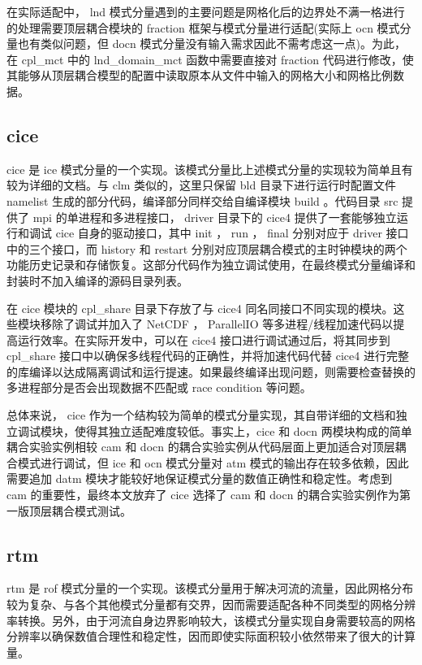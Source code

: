 在实际适配中， lnd 模式分量遇到的主要问题是网格化后的边界处不满一格进行的处理需要顶层耦合模块的 fraction 框架与模式分量进行适配(实际上 ocn 模式分量也有类似问题，但 docn 模式分量没有输入需求因此不需考虑这一点)。为此，在 cpl\_mct 中的 lnd\_domain\_mct 函数中需要直接对 fraction 代码进行修改，使其能够从顶层耦合模型的配置中读取原本从文件中输入的网格大小和网格比例数据。

\subsection{cice}

cice \cite{CICEdoc} \cite{CICEgithub} 是 ice 模式分量的一个实现。该模式分量比上述模式分量的实现较为简单且有较为详细的文档。与 clm 类似的，这里只保留 bld 目录下进行运行时配置文件 namelist 生成的部分代码，编译部分同样交给自编译模块 build 。代码目录 src 提供了 mpi 的单进程和多进程接口， driver 目录下的 cice4 提供了一套能够独立运行和调试 cice 自身的驱动接口，其中 init ， run ， final 分别对应于 driver 接口中的三个接口，而 history 和 restart 分别对应顶层耦合模式的主时钟模块的两个功能历史记录和存储恢复。这部分代码作为独立调试使用，在最终模式分量编译和封装时不加入编译的源码目录列表。

在 cice 模块的 cpl\_share 目录下存放了与 cice4 同名同接口不同实现的模块。这些模块移除了调试并加入了 NetCDF ， ParallelIO 等多进程/线程加速代码以提高运行效率。在实际开发中，可以在 cice4 接口进行调试通过后，将其同步到 cpl\_share 接口中以确保多线程代码的正确性，并将加速代码代替 cice4 进行完整的库编译以达成隔离调试和运行提速。如果最终编译出现问题，则需要检查替换的多进程部分是否会出现数据不匹配或 race condition 等问题。

总体来说， cice 作为一个结构较为简单的模式分量实现，其自带详细的文档和独立调试模块，使得其独立适配难度较低。事实上，cice 和 docn 两模块构成的简单耦合实验实例相较 cam 和 docn 的耦合实验实例从代码层面上更加适合对顶层耦合模式进行调试，但 ice 和 ocn 模式分量对 atm 模式的输出存在较多依赖，因此需要追加 datm 模块才能较好地保证模式分量的数值正确性和稳定性。考虑到 cam 的重要性，最终本文放弃了 cice 选择了 cam 和 docn 的耦合实验实例作为第一版顶层耦合模式测试。

\subsection{rtm}

rtm \cite{RTMdoc}是 rof 模式分量的一个实现。该模式分量用于解决河流的流量，因此网格分布较为复杂、与各个其他模式分量都有交界，因而需要适配各种不同类型的网格分辨率转换。另外，由于河流自身边界影响较大，该模式分量实现自身需要较高的网格分辨率以确保数值合理性和稳定性，因而即使实际面积较小依然带来了很大的计算量。

